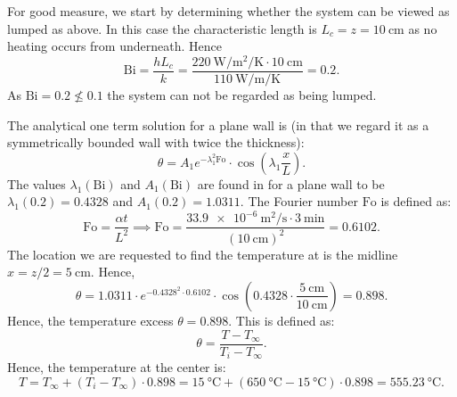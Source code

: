 \begin{derivation}
  For good measure, we start by determining whether the system can be viewed as lumped as above. In this case the characteristic length is $L_c = z = \qty{10}{\cm}$ as no heating occurs from underneath.
  Hence
  \begin{equation*}
    \mathrm{Bi} = \frac{h L_c}{k} = \frac{\qty{220}{\W\per\m\squared\per\K} \cdot \qty{10}{\cm}}{\qty{110}{\W\per\m\per\K} } = 0.2
  .\end{equation*}
  As $\mathrm{Bi} = \num{0,2} \not\leq \num{0,1}$ the system can not be regarded as being lumped. 

  The analytical one term solution for a plane wall is (in that we regard it as a symmetrically bounded wall with twice the thickness):
  \begin{equation*}
    \theta = A_1 e^{-\lambda_1^2 \mathrm{Fo}} \cdot \cos \left( \lambda_1 \frac{x}{L} \right)
  .\end{equation*}
  The values $\lambda_1(\mathrm{Bi})$ and $A_1(\mathrm{Bi})$ are found in  for a plane wall to be $\lambda_1(\num{0,2}) = \num{0,4328}$ and $A_1 (\num{0,2} ) = \num{1,0311}$.
  The Fourier number $\mathrm{Fo}$ is defined as:
  \begin{equation*}
    \mathrm{Fo} = \frac{\alpha t}{L^2} \implies \mathrm{Fo} = \frac{\qty{33,9e-6}{\m\squared\per\s} \cdot \qty{3}{\minute}}{(\qty{10}{\cm})^2 }  = \num{0.6102}
  .\end{equation*}
  The location we are requested to find the temperature at is the midline $x = z / 2 = \qty{5}{\cm}$.
  Hence,
  \begin{equation*}
    \theta = \num{1,0311} \cdot e^{-\num{0,4328}^2 \cdot \num{0,6102} } \cdot \cos \left( \num{0,4328} \cdot \frac{\qty{5}{\cm}}{\qty{10}{\cm} } \right) = \num{0.898}
  .\end{equation*}
  Hence, the temperature excess $\theta = \num{0,898}$.
  This is defined as:
  \begin{equation*}
    \theta = \frac{T - T_{\infty}}{T_i - T_{\infty}}
  .\end{equation*}
  Hence, the temperature at the center is:
  \begin{equation*}
    T = T_{\infty} + \left( T_i - T_{\infty} \right) \cdot \num{0,898} = \qty{15}{\celsius} + \left( \qty{650}{\celsius} - \qty{15}{\celsius} \right) \cdot \num{0,898}  = \qty{555.23}{\celsius}
  .\end{equation*}
\end{derivation}

